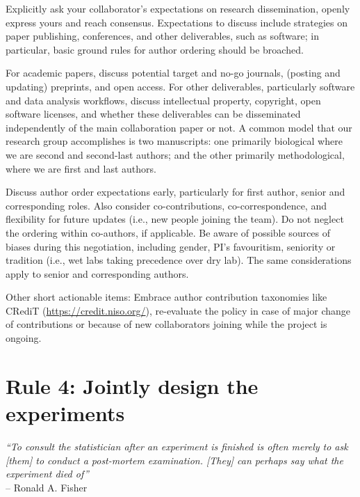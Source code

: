 \documentclass{article}
\begin{document}
Explicitly ask your collaborator's expectations on research dissemination, openly express yours and reach consensus. Expectations to discuss include strategies on paper publishing, conferences, and other deliverables, such as software; in particular, basic ground rules for author ordering should be broached.

For academic papers, discuss potential target and no-go journals, (posting and updating) preprints, and open access. For other deliverables, particularly software and data analysis workflows, discuss intellectual property, copyright, open software licenses, and whether these deliverables can be disseminated independently of the main collaboration paper or not. A common model that our research group accomplishes is two manuscripts: one primarily biological where we are second and second-last authors; and the other primarily methodological, where we are first and last authors.

Discuss author order expectations early, particularly for first author, senior and corresponding roles. Also consider co-contributions, co-correspondence, and flexibility for future updates (i.e., new people joining the team). Do not neglect the ordering within co-authors, if applicable. Be aware of possible sources of biases during this negotiation, including gender, PI's favouritism, seniority or tradition (i.e., wet labs taking precedence over dry lab). The same considerations apply to senior and corresponding authors. 

Other short actionable items: Embrace author contribution taxonomies like CRediT \cite{allen2014publishing} (\url{https://credit.niso.org/}), re-evaluate the policy in case of major change of contributions or because of new collaborators joining while the project is ongoing.

\section*{Rule 4: Jointly design the experiments} %
\label{rule4_experiments}

\begin{flushright}
\rightskip=1cm\textit{``To consult the statistician after an experiment is finished is often merely to ask [them] to conduct a post-mortem examination. [They] can perhaps say what the experiment died of''} \\
\vspace{.2em}
\rightskip=0cm -- Ronald A. Fisher
\end{flushright}
\end{document}
